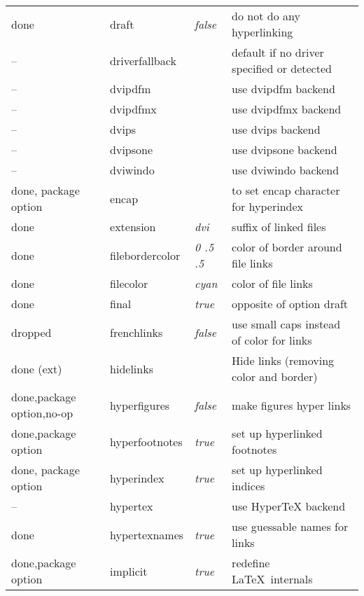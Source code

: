 \begin{longtable}{@{}l>{\ttfamily}llp{7cm}@{}}
done   & draft              & \textit{false}         & do not do any hyperlinking \\
--     & driverfallback     &                        & default if no driver specified or detected\\
--     & dvipdfm            &                        & use \textsf{dvipdfm} backend \\
--     & dvipdfmx           &                        & use \textsf{dvipdfmx} backend \\
--     & dvips              &                        & use \textsf{dvips} backend \\
--     & dvipsone           &                        & use \textsf{dvipsone} backend \\
--     & dviwindo           &                        & use \textsf{dviwindo} backend \\
done, package option   &encap              &                        & to set encap character for hyperindex \\
done  &extension          & \textit{dvi}           & suffix of linked files \\
done &filebordercolor    & \textit{0 .5 .5}       & color of border around file links \\
done &filecolor          & \textit{cyan}          & color of file links \\
done   &final              & \textit{true}          & opposite of option draft \\
dropped &frenchlinks        & \textit{false}         & use small caps instead of color for links \\
done (ext) & hidelinks          &                        & Hide links (removing color and border) \\
done,package option,no-op& hyperfigures       & \textit{false}         & make figures hyper links \\
done,package option & hyperfootnotes     & \textit{true}          & set up hyperlinked footnotes \\
done, package option& hyperindex         & \textit{true}          & set up hyperlinked indices \\
-- & hypertex           &                        & use \textsf{Hyper\TeX} backend \\
done & hypertexnames      & \textit{true}          & use guessable names for links \\
done,package option & implicit           & \textit{true}          & redefine \LaTeX\ internals \\

\end{longtable}
